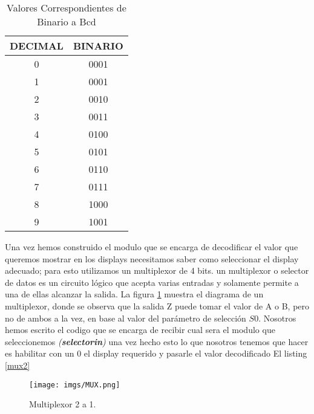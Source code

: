 \documentclass[paper=a4, fontsize=12pt]{article}        %
\numberwithin{equation}{section}                        %
\numberwithin{table}{section}                           %
\begin{document}
\begin{table}[H]
\centering
\begin{tabular}{|c|c|}
\hline
\textbf{DECIMAL} & \textbf{BINARIO} \\ \hline
0                & 0001             \\ \hline
1                & 0001             \\ \hline
2                & 0010             \\ \hline
3                & 0011             \\ \hline
4                & 0100             \\ \hline
5                & 0101             \\ \hline
6                & 0110             \\ \hline
7                & 0111             \\ \hline
8                & 1000             \\ \hline
9                & 1001             \\ \hline
\end{tabular}
\caption{Valores Correspondientes de Binario a Bcd}
\label{my-label}
\end{table}
Una vez hemos construido el modulo que se encarga de decodificar el valor  que queremos mostrar en los displays necesitamos saber como seleccionar el display adecuado; para esto utilizamos un multiplexor de 4 bits. un multiplexor o selector de datos es un circuito lógico que acepta varias entradas y solamente permite a una de ellas alcanzar la salida. La figura \ref{fig:mux} muestra el diagrama de un multiplexor, donde se observa que la salida Z puede tomar el valor de A o B, pero no de ambos a la vez, en base al valor del parámetro de selección $S0$. Nosotros hemos escrito el codigo que se encarga de recibir cual sera el modulo que seleccionemos \textit{(\textbf{selectorin})} una vez hecho esto lo que nosotros tenemos que hacer es habilitar con un 0 el display requerido y pasarle el valor decodificado El listing \ref{mux2}
\begin{figure}[H]
  \centering
     \texttt{[image: imgs/MUX.png]}
  \caption{Multiplexor 2 a 1.}
    \label{fig:mux}
\end{figure}
\end{document}
